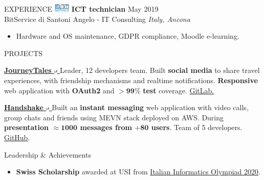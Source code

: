 \documentclass{cv} %
\def\intraexpvspace{0.15cm}
\begin{document}
\begin{minipage}[b][0.9\paperheight][t]{0.7\linewidth}
\begin{rSection}{EXPERIENCE}
    \includegraphics[width=0.75cm, trim={0cm 1.5cm 0cm 0cm}]{bitservice-icon.png}
    \textbf{ICT technician} \hfill May 2019 \\
    \hspace*{0.85cm}BitService di Santoni Angelo - IT Consulting \hfill \textit{Italy, Ancona}
    \begin{itemize}
        \item Hardware and OS maintenance, GDPR compliance, Moodle e-learning.
    \end{itemize}
\end{rSection}

\begin{rSection}{PROJECTS}
    \item \textbf{\href{https://pufferfish.sa4.usi.ch/login}
        {
            JourneyTales
            \includegraphics[width=0.15cm, trim={10cm -10cm 0cm 0cm}]{ext-link-icon.png}
        }}
    {Leader, 12 developers team.
        Built \textbf{social media} to share travel experiences,
        with friendship mechanisms and realtime notifications.
        \textbf{Responsive} web application with \textbf{OAuth2} and $\boldsymbol{> 99\%}$ \textbf{test} coverage.
        \href{https://gitlab.com/usi-si-oss/teaching/projects-showcase/sa4/team-4-pufferfish}{GitLab.}
    }

    \vspace{\intraexpvspace}
    \item \textbf{\href{https://handshakeapp.ch}{
            Handshake
            \includegraphics[width=0.15cm, trim={10cm -10cm 0cm 0cm}]{ext-link-icon.png}
        }}
    {Built an \textbf{instant messaging} web application with video calls, group chats and friends
        using MEVN stack deployed on AWS.
        During \textbf{presentation $\boldsymbol{\approx1000}$ messages from $\boldsymbol{+ 80}$ users}.
        Team of 5 developers.
        \href{https://github.com/ogs-at-usi/handshake}{GitHub}.
    }
\end{rSection}
\begin{rSection}{Leadership \& Achievements}
    \vspace{0.2cm}
    \begin{itemize}[leftmargin=*]
        \itemsep 0.2em 
    \item \textbf{Swiss Scholarship} awarded at USI from 
        \href{https://www.olimpiadi-informatica.it/index.php/selezione-territoriale-20.html}{Italian Informatics Olympiad 2020}.


\end{itemize}
\end{rSection}
\end{minipage}
\end{document}
